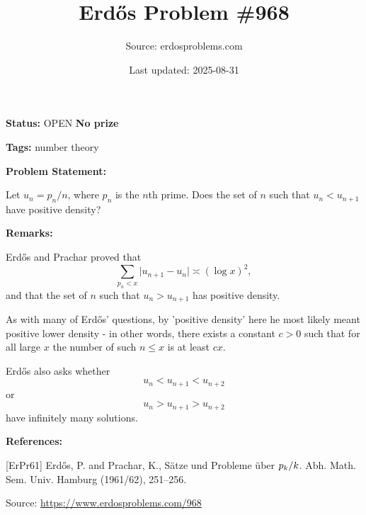 \documentclass{article}
\title{Erd\H{o}s Problem \#968}
\date{Last updated: 2025-08-31}
\author{Source: erdosproblems.com}
\begin{document}
\maketitle

\noindent\textbf{Status:} OPEN \quad \textbf{No prize}

\noindent\textbf{Tags:} number theory

\medskip
\noindent\textbf{Problem Statement:}

Let $u_n=p_n/n$, where $p_n$ is the $n$th prime. Does the set of $n$ such that $u_n<u_{n+1}$ have positive density?

\bigskip
\noindent\textbf{Remarks:}

Erd\H{o}s and Prachar \cite{ErPr61} proved that\[\sum_{p_n<x} \lvert u_{n+1}-u_n\rvert \asymp (\log x)^2,\]and that the set of $n$ such that $u_n>u_{n+1}$ has positive density.

As with many of Erd\H{o}s' questions, by 'positive density' here he most likely meant positive lower density - in other words, there exists a constant $c>0$ such that for all large $x$ the number of such $n\leq x$ is at least $cx$.

Erd\H{o}s also asks whether\[u_n<u_{n+1}<u_{n+2}\]or\[u_n>u_{n+1}>u_{n+2}\]have infinitely many solutions.

\bigskip
\noindent\textbf{References:}

[ErPr61] Erd\H{o}s, P. and Prachar, K., S\"{a}tze und {P}robleme \"{u}ber {$p\sb{k}/k$}. Abh. Math. Sem. Univ. Hamburg (1961/62), 251--256.

\bigskip
\noindent\small{Source: \url{https://www.erdosproblems.com/968}}
\end{document}
